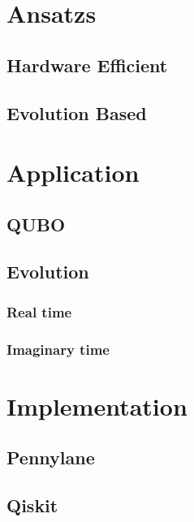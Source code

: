 \section{}

\section{Ansatzs}

\subsection{Hardware Efficient}

\subsection{Evolution Based}


\section{Application}

\subsection{QUBO}

\subsection{Evolution}

\subsubsection{Real time}

\subsubsection{Imaginary time}

\section{Implementation}

\subsection{Pennylane}

\subsection{Qiskit}

